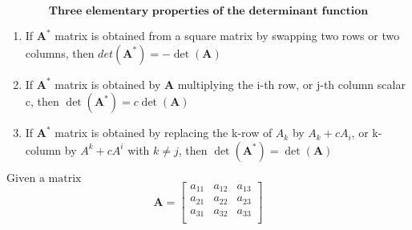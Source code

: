 \documentclass[10pt]{article}
\begin{document}
\[ \textbf{Three elementary properties of the determinant function} \] 
\noindent 
\begin{enumerate}
\item If $\mathbf{A}^{\ast}$ matrix is obtained from a square matrix by swapping two rows or two columns, then $det(\mathbf{A}^{\ast}) = -\det(\mathbf{A})$  
\item If $\mathbf{A}^{\ast}$ matrix is obtained by $\mathbf{A}$ multiplying the i-th row, or j-th column scalar c, then 
   $\det (\mathbf{A^{\ast}}) = c\det (\mathbf{A})$
\item If $\mathbf{A^{\ast}}$ matrix is obtained by replacing the k-row of $A_{k}$ by $A_{k} + cA_{i}$, or k-column by $A^{k} + cA^{i}$ with $k \neq j$, then
   $\det (\mathbf{A^{\ast}}) = \det (\mathbf{A})$ 
\end{enumerate}

\noindent
$\mbox{Given a matrix}$  
\[
    \mathbf{A} =  
    \begin{bmatrix}
    a_{11} & a_{12} & a_{13}\\
    a_{21} & a_{22} & a_{23}\\
    a_{31} & a_{32} & a_{33}\\
    \end{bmatrix} \nonumber
\] \\
\end{document}
